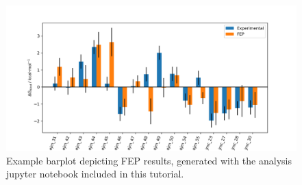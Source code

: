 \begin{figure}[htp]
\includegraphics[width=\linewidth]{04_fep/inputs/tut_imgs/fep_barplot.png}
\caption{Example barplot depicting FEP results, generated with the analysis jupyter notebook included in this tutorial.}
\label{fep_barplot_fig}
\end{figure}



    
    




